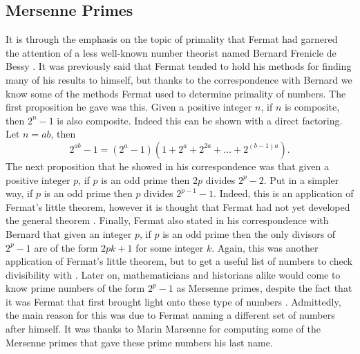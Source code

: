 \documentclass[11pt]{article}
\begin{document}
\subsection*{Mersenne Primes}
It is through the emphasis on the topic of primality that Fermat had garnered the
attention of a less well-known number theorist named
Bernard Frenicle de Bessy \cite{Mahoney}.
It was previously said that Fermat tended to hold his methods for finding many
of his results to himself, but thanks to the correspondence with Bernard we
know some of the methods Fermat used to determine primality of numbers.
The first proposition he gave was this.
Given a positive integer $n$, if $n$ is composite, then $2^n - 1$ is also 
composite.
Indeed this can be shown with a direct factoring.
Let $n = ab$, then
\[2^{ab} - 1 = (2^a - 1)(1 + 2^a + 2^{2a} + \dots +2^{(b-1)a} ). \]
The next proposition that he showed in his correspondence was that given a 
positive integer $p$, if $p$ is an odd prime then $2p$ divides $2^p-2$.
Put in a simpler way, if $p$ is an odd prime then $p$ divides $2^{p-1} - 1$.
Indeed, this is an application of Fermat's little theorem, however it is thought
that Fermat had not yet developed the general theorem \cite{Ball, Mahoney}.
Finally, Fermat also stated in his correspondence with Bernard that given an
integer $p$, if $p$ is an odd prime then the only divisors of $2^p -1$ are of
the form $2pk +1$ for some integer $k$.
Again, this was another application of Fermat's little theorem, but to get a
useful list of numbers to check divisibility with \cite{MersennePrime}.
Later on, mathematicians and historians alike would come to know prime numbers
of the form $2^p -1$ as Mersenne primes, despite the fact that it was Fermat
that first brought light onto these type of numbers \cite{Mahoney}.
Admittedly, the main reason for this was due to Fermat naming a different set
of numbers after himself.
It was thanks to Marin Marsenne for computing some of the Mersenne primes that
gave these prime numbers his last name.
\end{document}
